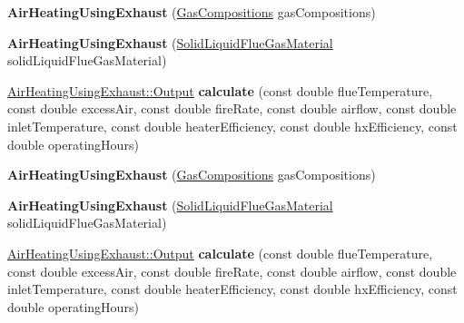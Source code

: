 \begin{DoxyCompactItemize}
\item 
\mbox{\label{class_air_heating_using_exhaust_ad045db7365fe15661f874334ef5a0ac5}} 
{\bfseries Air\+Heating\+Using\+Exhaust} (\hyperlink{class_gas_compositions}{Gas\+Compositions} gas\+Compositions)
\item 
\mbox{\label{class_air_heating_using_exhaust_a328f1777f5cbbc7616396e86e91c97c3}} 
{\bfseries Air\+Heating\+Using\+Exhaust} (\hyperlink{class_solid_liquid_flue_gas_material}{Solid\+Liquid\+Flue\+Gas\+Material} solid\+Liquid\+Flue\+Gas\+Material)
\item 
\mbox{\label{class_air_heating_using_exhaust_a0f0647110e8e93268e0c1cbc65fdd4af}} 
\hyperlink{struct_air_heating_using_exhaust_1_1_output}{Air\+Heating\+Using\+Exhaust\+::\+Output} {\bfseries calculate} (const double flue\+Temperature, const double excess\+Air, const double fire\+Rate, const double airflow, const double inlet\+Temperature, const double heater\+Efficiency, const double hx\+Efficiency, const double operating\+Hours)
\item 
\mbox{\label{class_air_heating_using_exhaust_ad045db7365fe15661f874334ef5a0ac5}} 
{\bfseries Air\+Heating\+Using\+Exhaust} (\hyperlink{class_gas_compositions}{Gas\+Compositions} gas\+Compositions)
\item 
\mbox{\label{class_air_heating_using_exhaust_a328f1777f5cbbc7616396e86e91c97c3}} 
{\bfseries Air\+Heating\+Using\+Exhaust} (\hyperlink{class_solid_liquid_flue_gas_material}{Solid\+Liquid\+Flue\+Gas\+Material} solid\+Liquid\+Flue\+Gas\+Material)
\item 
\mbox{\label{class_air_heating_using_exhaust_a0f0647110e8e93268e0c1cbc65fdd4af}} 
\hyperlink{struct_air_heating_using_exhaust_1_1_output}{Air\+Heating\+Using\+Exhaust\+::\+Output} {\bfseries calculate} (const double flue\+Temperature, const double excess\+Air, const double fire\+Rate, const double airflow, const double inlet\+Temperature, const double heater\+Efficiency, const double hx\+Efficiency, const double operating\+Hours)
\item 

\end{DoxyCompactItemize}

